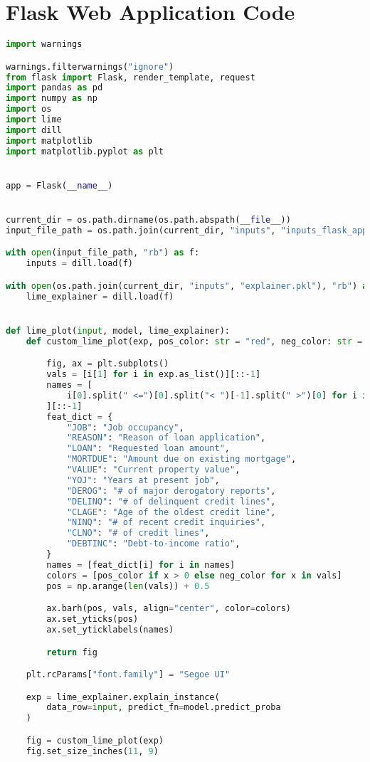 \section{Flask Web Application Code}
\begin{lstlisting}[language=Python, basicstyle=\footnotesize\ttfamily]
import warnings

warnings.filterwarnings("ignore")
from flask import Flask, render_template, request
import pandas as pd
import numpy as np
import os
import lime
import dill
import matplotlib
import matplotlib.pyplot as plt


app = Flask(__name__)


current_dir = os.path.dirname(os.path.abspath(__file__))
input_file_path = os.path.join(current_dir, "inputs", "inputs_flask_app_dict.pkl")

with open(input_file_path, "rb") as f:
	inputs = dill.load(f)

with open(os.path.join(current_dir, "inputs", "explainer.pkl"), "rb") as f:
	lime_explainer = dill.load(f)


def lime_plot(input, model, lime_explainer):
	def custom_lime_plot(exp, pos_color: str = "red", neg_color: str = "green"):

		fig, ax = plt.subplots()
		vals = [i[1] for i in exp.as_list()][::-1]
		names = [
			i[0].split(" <=")[0].split("< ")[-1].split(" >")[0] for i in exp.as_list()
		][::-1]
		feat_dict = {
			"JOB": "Job occupancy",
			"REASON": "Reason of loan application",
			"LOAN": "Requested loan amount",
			"MORTDUE": "Amount due on existing mortgage",
			"VALUE": "Current property value",
			"YOJ": "Years at present job",
			"DEROG": "# of major derogatory reports",
			"DELINQ": "# of delinquent credit lines",
			"CLAGE": "Age of the oldest credit line",
			"NINQ": "# of recent credit inquiries",
			"CLNO": "# of credit lines",
			"DEBTINC": "Debt-to-income ratio",
		}
		names = [feat_dict[i] for i in names]
		colors = [pos_color if x > 0 else neg_color for x in vals]
		pos = np.arange(len(vals)) + 0.5

		ax.barh(pos, vals, align="center", color=colors)
		ax.set_yticks(pos)
		ax.set_yticklabels(names)

		return fig

	plt.rcParams["font.family"] = "Segoe UI"

	exp = lime_explainer.explain_instance(
		data_row=input, predict_fn=model.predict_proba
	)

	fig = custom_lime_plot(exp)
	fig.set_size_inches(11, 9)


\end{lstlisting}
